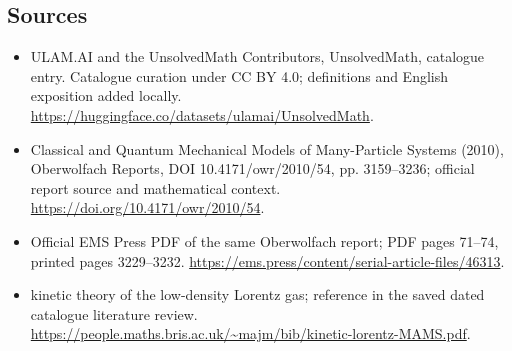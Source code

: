 \documentclass[11pt]{article}
\begin{document}
\subsection{Sources}
\begin{itemize}
\item[\hypertarget{source:statement:1}{S1}] ULAM.AI and the UnsolvedMath Contributors, UnsolvedMath, catalogue entry. Catalogue curation under CC BY 4.0; definitions and English exposition added locally.
\url{https://huggingface.co/datasets/ulamai/UnsolvedMath}.
\item[\hypertarget{source:statement:2}{S2}] Classical and Quantum Mechanical Models of Many-Particle Systems (2010), Oberwolfach Reports, DOI 10.4171/owr/2010/54, pp. 3159--3236; official report source and mathematical context.
\url{https://doi.org/10.4171/owr/2010/54}.
\item[\hypertarget{source:statement:3}{S3}] Official EMS Press PDF of the same Oberwolfach report; PDF pages 71--74, printed pages 3229--3232.
\url{https://ems.press/content/serial-article-files/46313}.
\item[\hypertarget{source:statement:4}{S4}] kinetic theory of the low-density Lorentz gas; reference in the saved dated catalogue literature review.
\url{https://people.maths.bris.ac.uk/~majm/bib/kinetic-lorentz-MAMS.pdf}.
\end{itemize}
\label{end:statement}
\end{document}
